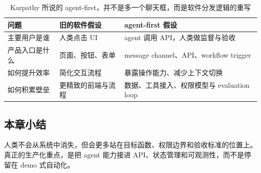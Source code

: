 \begin{table}[H]
\centering
\begin{tabular}{p{3.0cm}p{4.1cm}p{4.8cm}}
\toprule
\textbf{问题} & \textbf{旧的软件假设} & \textbf{agent-first 假设} \\
\midrule
主要用户是谁 & 人类点击 UI & agent 调用 API，人类做监督与验收 \\
产品入口是什么 & 页面、按钮、表单 & message channel、API、workflow trigger \\
如何提升效率 & 简化交互流程 & 暴露操作能力、减少上下文切换 \\
如何积累壁垒 & 更精致的前端与流程 & 数据、工具接入、权限模型与 evaluation loop \\
\bottomrule
\end{tabular}
\caption{Karpathy 所说的 agent-first，并不是多一个聊天框，而是软件分发逻辑的重写}
\end{table}

\subsection{本章小结}
人类不会从系统中消失，但会更多站在目标函数、权限边界和验收标准的位置上。真正的生产化重点，是把 agent 能力接进 API、状态管理和可观测性，而不是停留在 demo 式自动化。


